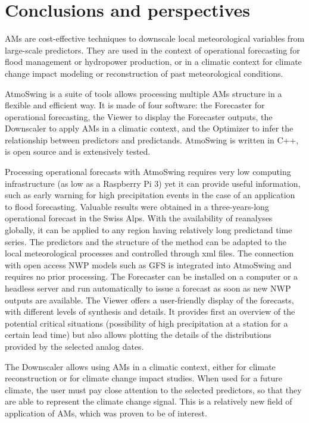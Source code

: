 \documentclass[review]{elsarticle}
\begin{document}
\section{Conclusions and perspectives}
\label{sec:conclusions}

AMs are cost-effective techniques to downscale local meteorological variables from large-scale predictors. They are used in the context of operational forecasting for flood management or hydropower production, or in a climatic context for climate change impact modeling or reconstruction of past meteorological conditions. 

AtmoSwing is a suite of tools allows processing multiple AMs structure in a flexible and efficient way. It is made of four software: the Forecaster for operational forecasting, the Viewer to display the Forecaster outputs, the Downscaler to apply AMs in a climatic context, and the Optimizer to infer the relationship between predictors and predictands. AtmoSwing is written in C++, is open source and is extensively tested.

Processing operational forecasts with AtmoSwing requires very low computing infrastructure (as low as a Raspberry Pi 3) yet it can provide useful information, such as early warning for high precipitation events in the case of an application to flood forecasting. Valuable results were obtained in a three-years-long operational forecast in the Swiss Alps. With the availability of reanalyses globally, it can be applied to any region having relatively long predictand time series. The predictors and the structure of the method can be adapted to the local meteorological processes and controlled through xml files. The connection with open access NWP models such as GFS is integrated into AtmoSwing and requires no prior processing. The Forecaster can be installed on a computer or a headless server and run automatically to issue a forecast as soon as new NWP outputs are available. The Viewer offers a user-friendly display of the forecasts, with different levels of synthesis and details. It provides first an overview of the potential critical situations (possibility of high precipitation at a station for a certain lead time) but also allows plotting the details of the distributions provided by the selected analog dates.

The Downscaler allows using AMs in a climatic context, either for climate reconstruction or for climate change impact studies. When used for a future climate, the user must pay close attention to the selected predictors, so that they are able to represent the climate change signal. This is a relatively new field of application of AMs, which was proven to be of interest.
\end{document}
